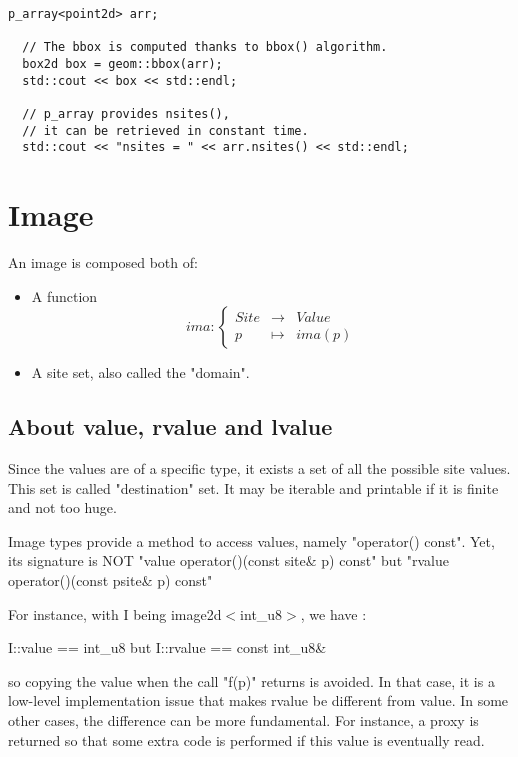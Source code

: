 \documentclass{report}
\newenvironment{doxycode}
{%
\begin{latexonly}%
\begin{lstlisting}[frame=single]%
\end{latexonly}%
\begin{htmlonly}%
\backslash code%
\end{htmlonly}%
}
{%
\begin{htmlonly}%
\backslash endcode%
\end{htmlonly}%
\begin{latexonly}%
\end{lstlisting}%
\end{latexonly}%
}
\begin{document}
\begin{lstlisting}[frame=single]
  p_array<point2d> arr;

  // The bbox is computed thanks to bbox() algorithm.
  box2d box = geom::bbox(arr);
  std::cout << box << std::endl;

  // p_array provides nsites(),
  // it can be retrieved in constant time.
  std::cout << "nsites = " << arr.nsites() << std::endl;
\end{lstlisting}


\clearpage
\newpage
\chapter{Image}

An image is composed both of:
\begin{itemize}
\item A function $$
ima : \left\{
  \begin{array}{lll}
    Site &\rightarrow & Value \\
    p & \mapsto & ima(p)
  \end{array}
\right.
$$
\item A site set, also called the "domain".
\end{itemize}

\section{About value, rvalue and lvalue}

Since the values are of a specific type, it exists a set of all the possible
site values. This set is called "destination" set. It may be iterable and
printable if it is finite and not too huge.

Image types provide a method to access values, namely "operator() const".
Yet, its signature is NOT "value operator()(const site\& p) const"
but "rvalue operator()(const psite\& p) const"

For instance, with I being image2d$<$int\_u8$>$, we have :

\begin{center}
    I::value == int\_u8  but  I::rvalue == const int\_u8\&
\end{center}

so copying the value when the call "f(p)" returns is avoided.
In that case, it is a low-level implementation issue that makes rvalue
be different from value.  In some other cases, the difference can be
more fundamental.  For instance, a proxy is returned so that some extra
code is performed if this value is eventually read.
\end{document}
